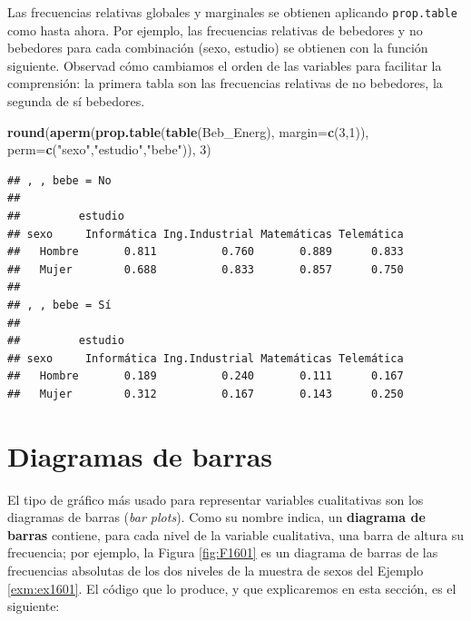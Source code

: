 \documentclass[]{book}
\newenvironment{Shaded}{\begin{snugshade}}{\end{snugshade}}
\newcommand{\DataTypeTok}[1]{\textcolor[rgb]{0.13,0.29,0.53}{#1}}
\newcommand{\DecValTok}[1]{\textcolor[rgb]{0.00,0.00,0.81}{#1}}
\newcommand{\KeywordTok}[1]{\textcolor[rgb]{0.13,0.29,0.53}{\textbf{#1}}}
\newcommand{\NormalTok}[1]{#1}
\newcommand{\StringTok}[1]{\textcolor[rgb]{0.31,0.60,0.02}{#1}}
\theoremstyle{definition}
\theoremstyle{definition}
\theoremstyle{definition}
\theoremstyle{remark}
\begin{document}
Las frecuencias relativas globales y marginales se obtienen aplicando \texttt{prop.table} como hasta ahora. Por ejemplo, las frecuencias relativas de bebedores y no bebedores para cada combinación (sexo, estudio) se obtienen con la función siguiente. Observad cómo cambiamos el orden de las variables para facilitar la comprensión: la primera tabla son las frecuencias relativas de no bebedores, la segunda de sí bebedores.

\begin{Shaded}
\begin{Highlighting}[]
\KeywordTok{round}\NormalTok{(}\KeywordTok{aperm}\NormalTok{(}\KeywordTok{prop.table}\NormalTok{(}\KeywordTok{table}\NormalTok{(Beb_Energ), }\DataTypeTok{margin=}\KeywordTok{c}\NormalTok{(}\DecValTok{3}\NormalTok{,}\DecValTok{1}\NormalTok{)), }\DataTypeTok{perm=}\KeywordTok{c}\NormalTok{(}\StringTok{"sexo"}\NormalTok{,}\StringTok{"estudio"}\NormalTok{,}\StringTok{"bebe"}\NormalTok{)), }\DecValTok{3}\NormalTok{)}
\end{Highlighting}
\end{Shaded}

\begin{verbatim}
## , , bebe = No
## 
##         estudio
## sexo     Informática Ing.Industrial Matemáticas Telemática
##   Hombre       0.811          0.760       0.889      0.833
##   Mujer        0.688          0.833       0.857      0.750
## 
## , , bebe = Sí
## 
##         estudio
## sexo     Informática Ing.Industrial Matemáticas Telemática
##   Hombre       0.189          0.240       0.111      0.167
##   Mujer        0.312          0.167       0.143      0.250
\end{verbatim}

\hypertarget{diagramas-de-barras}{%
\section{Diagramas de barras}\label{diagramas-de-barras}}

El tipo de gráfico más usado para representar variables cualitativas son los diagramas de barras (\emph{bar plots}). Como su nombre indica, un \textbf{diagrama de barras} contiene, para cada nivel de la variable cualitativa, una barra de altura su frecuencia; por ejemplo, la Figura \ref{fig:F1601} es un diagrama de barras de las frecuencias absolutas de los dos niveles de la muestra de sexos del Ejemplo \ref{exm:ex1601}. El código que lo produce, y que explicaremos en esta sección, es el siguiente:
\end{document}
